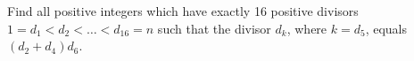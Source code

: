 Find all positive integers which have exactly 16 positive divisors $1 = d_1 < d_2 < \ldots < d_{16} =n$ such that the divisor $d_k$, where $k = d_5$, equals $(d_2 + d_4) d_6$.
